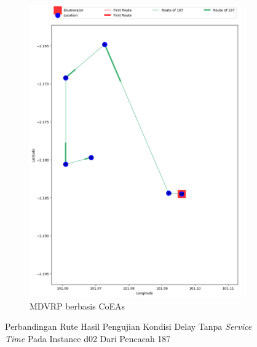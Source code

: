 \begin{figure}[H]
	\centering
	\begin{subfigure}[t]{\textwidth}
		\centering
		\includegraphics[width=\textwidth]{Resources/Images/delayed_2/real_m15_n100_delayed_2_187_coes}
		\caption{MDVRP berbasis CoEAs}
		\label{fig:real_m15_n100_delayed_2_187_coes}
	\end{subfigure}
	\caption{Perbandingan Rute Hasil Pengujian Kondisi Delay Tanpa \textit{Service Time} Pada Instance d02 Dari Pencacah 187}
	\label{fig:real_m15_n100_delayed_2_187}
\end{figure}


